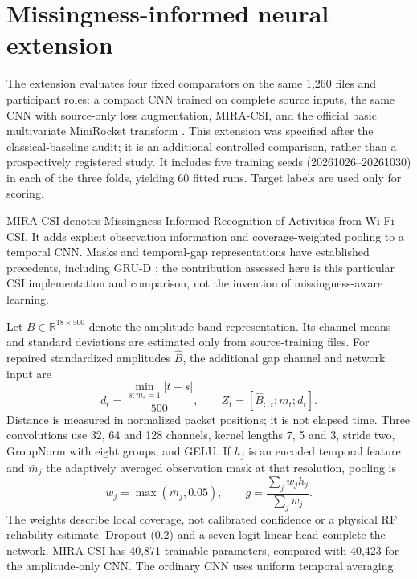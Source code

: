 \section{Missingness-informed neural extension}
The extension evaluates four fixed comparators on the same 1,260 files and participant roles: a compact CNN trained on complete source inputs, the same CNN with source-only loss augmentation, MIRA-CSI, and the official basic multivariate MiniRocket transform \cite{dempster2021}. This extension was specified after the classical-baseline audit; it is an additional controlled comparison, rather than a prospectively registered study. It includes five training seeds (20261026--20261030) in each of the three folds, yielding 60 fitted runs. Target labels are used only for scoring.

MIRA-CSI denotes Missingness-Informed Recognition of Activities from Wi-Fi CSI. It adds explicit observation information and coverage-weighted pooling to a temporal CNN. Masks and temporal-gap representations have established precedents, including GRU-D \cite{che2018}; the contribution assessed here is this particular CSI implementation and comparison, not the invention of missingness-aware learning.

Let $B\in\mathbb R^{18\times500}$ denote the amplitude-band representation. Its channel means and standard deviations are estimated only from source-training files. For repaired standardized amplitudes $\widehat B$, the additional gap channel and network input are
\begin{equation}
 d_t=\frac{\min_{s:m_s=1}|t-s|}{500},\qquad
 Z_t=[\widehat B_{:,t};m_t;d_t].
\label{eq:mirainput}
\end{equation}
Distance is measured in normalized packet positions; it is not elapsed time. Three convolutions use 32, 64 and 128 channels, kernel lengths 7, 5 and 3, stride two, GroupNorm with eight groups, and GELU. If $h_j$ is an encoded temporal feature and $\bar m_j$ the adaptively averaged observation mask at that resolution, pooling is
\begin{equation}
 w_j=\max(\bar m_j,0.05),\qquad
 g=\frac{\sum_jw_jh_j}{\sum_jw_j}.
\label{eq:mirapool}
\end{equation}
The weights describe local coverage, not calibrated confidence or a physical RF reliability estimate. Dropout (0.2) and a seven-logit linear head complete the network. MIRA-CSI has 40,871 trainable parameters, compared with 40,423 for the amplitude-only CNN. The ordinary CNN uses uniform temporal averaging.

